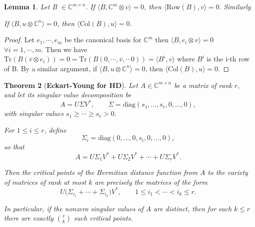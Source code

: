 \documentclass[11pt]{amsart}
\theoremstyle{plain}
\newtheorem{theorem}{Theorem}
\newtheorem{lemma}[theorem]{Lemma}
\theoremstyle{definition}
\theoremstyle{remark}
\begin{document}
 \begin{lemma}
    

Let  B $\in \mathbb{C}^{m \times n}$.  If  $\langle B, \mathbb{C}^m \otimes v \rangle = 0$,  then $\langle \text{Row}(B), v \rangle = 0.$ Similarly

If  $\langle B, u \otimes \mathbb{C}^n \rangle = 0$,  then  $\langle \text{Col}(B), u \rangle = 0$.

\end{lemma}
\begin{proof}
    Let ${e_1,\cdots ,e_m}$ be the canonical basis for $\mathbb{C}^m$ then $\langle B,e_i\otimes v\rangle=0$ $\forall i=1,\cdots,m$. Then we have $\mathrm{Tr}(B(\overline{v}\otimes e_i))=0=\mathrm{Tr}(B(0,\cdots ,\overline{v} ,\cdots0))=\langle B^i,v\rangle$ where $B^i$ is the i-th row of B. By a similar argument, if $\langle B, u \otimes \mathbb{C}^n \rangle = 0$, then $\langle \text{Col}(B), u \rangle = 0$.

\end{proof}
\begin{theorem}[\textbf{Eckart-Young for HD}]\label{gg}
Let $A \in \mathbb{C}^{m \times n}$ be a matrix of rank $r$, and let its singular value decomposition be
$$
A = U \Sigma V^*, \qquad 
\Sigma = \mathrm{diag}(s_1, \dots, s_r, 0, \dots, 0),
$$
with singular values $s_1 \geq \cdots \geq s_r > 0$.  

For $1 \leq i \leq r$, define 
$$
\Sigma_i = \mathrm{diag}(0, \dots, 0, s_i, 0, \dots, 0),
$$
so that
$$
A = U \Sigma_1 V^* + U \Sigma_2 V^* + \cdots + U \Sigma_r V^*.
$$

Then the critical points of the Hermitian distance  function from $A$ to the variety of matrices of rank at most $k$ are precisely the matrices of the form
$$
U \bigl(\Sigma_{i_1} + \cdots + \Sigma_{i_k}\bigr) V^*, 
\qquad 1 \leq i_1 < \cdots < i_k \leq r.
$$

In particular, if the nonzero singular values of $A$ are distinct, then for each $k \leq r$ there are exactly $\binom{r}{k}$ such critical points.
\end{theorem}
\end{document}

